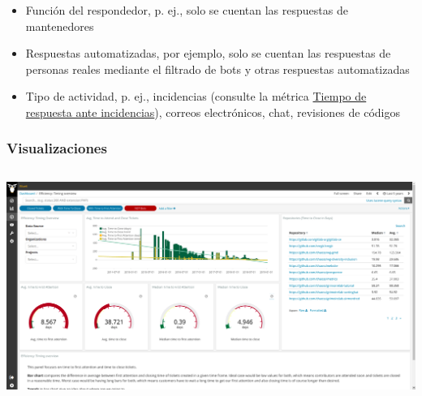 \begin{itemize}
\tightlist
\item
  Función del respondedor, p. ej., solo se cuentan las respuestas de
  mantenedores
\item
  Respuestas automatizadas, por ejemplo, solo se cuentan las respuestas
  de personas reales mediante el filtrado de bots y otras respuestas
  automatizadas
\item
  Tipo de actividad, p. ej., incidencias (consulte la métrica
  \href{https://github.com/chaoss/wg-evolution/blob/master/metrics/Issue_Response_Time.md}{Tiempo
  de respuesta ante incidencias}), correos electrónicos, chat,
  revisiones de códigos
\end{itemize}

\hypertarget{visualizaciones}{%
\subsubsection{Visualizaciones}\label{visualizaciones}}

\hypertarget{panel-de-grimoirelab-descripciuxf3n-general-del-tiempo-de-eficiencia}{%
\subsection{\texorpdfstring{\protect\includegraphics{images/time-to-first-response_efficiency-timing-overview.png}}{Panel de GrimoireLab: descripción general del tiempo de eficiencia}}\label{panel-de-grimoirelab-descripciuxf3n-general-del-tiempo-de-eficiencia}}


